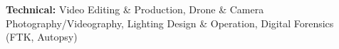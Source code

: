 \textbf{Technical:} Video Editing \& Production, Drone \& Camera Photography/Videography, Lighting Design \& Operation, Digital Forensics (FTK, Autopsy) \\
